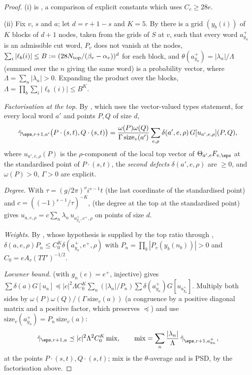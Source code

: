 \begin{proof}
(i) is , a comparison of explicit constants which uses $C_c\ge28e$.

(ii) Fix $v$, $s$ and $a$; let $d=r+1-s$ and $K=5$. By  there is a
grid $(y_b(i))$ of $K$ blocks of $d+1$ nodes, taken from the grids of $S$ at $v$, such that every word $a^+_{y_n}$ is an
admissible cut word, $P_v$ does not vanish at the nodes, $\sum_i|\ell_b(i)|\le B:=(28N_{\mathrm{top}}/(\beta_v-\alpha_v))^d$
for each block, and $\theta(a^+_{y_n})=|\lambda_n|/\Lambda$ (summed over the $n$ giving the same word) is a probability vector,
where $\Lambda=\sum_n|\lambda_n|>0$. Expanding the product over the blocks, $\Lambda=\prod_b\sum_i|\ell_b(i)|\le B^K$.

\emph{Factorisation at the top.} By , which uses the vector-valued types
statement, for every local word $a'$ and points $P,Q$ of size $d$,
\[
\tilde\gamma_{\eps,r+1,a'}\bigl(P\cdot(s,t),Q\cdot(s,t)\bigr)=\frac{\omega(P)\omega(Q)}{\Gamma\,\mathrm{size}_v(a')}\sum_{e,\rho}
\delta(a',e,\rho)\,G[u_{a',e,\rho}](P,Q),
\]
where $u_{a',e,\rho}(P)$ is the $\rho$-component of the local top vector of $\Theta_{a',e}F_{v,\eps}$ at the standardised point
of $P\cdot(s,t)$, the \emph{second defects} $\delta(a',e,\rho)$ are $\ge0$, and $\omega(P)>0$, $\Gamma>0$ are explicit.

\emph{Degree.} With $\tau=(g/2\pi)^{\nu}i^{s-1}t$ (the last coordinate of the standardised point) and
$c=((-1)^{s-1}/\tau)^{-K}$,  (the degree at the top at the standardised
point) gives $u_{a,e,\rho}=c\sum_n\lambda_n\,u_{a^+_{y_n},e^+,\rho}$ on points of size $d$.

\emph{Weights.} By , whose hypothesis is supplied by the
top ratio through ,
$\delta(a,e,\rho)P_n\le C_0^K\delta(a^+_{y_n},e^+,\rho)$ with $P_n=\prod_b|P_v(y_b(n_b))|>0$ and $C_0=eA_v(TT')^{-1/2}$.

\emph{Loewner bound.}  (with $g_n(e)=e^+$, injective) gives
$\sum\delta(a)G[u_a]\preceq|c|^2\Lambda C_0^K\sum_n(|\lambda_n|/P_n)\sum\delta(a^+_{y_n})G[u_{a^+_{y_n}}]$. Multiply both sides
by $\omega(P)\omega(Q)/(\Gamma\,\mathrm{size}_v(a))$ (a congruence by a positive diagonal matrix and a positive factor, which
preserves $\preceq$) and use $\mathrm{size}_v(a^+_{y_n})=P_n\,\mathrm{size}_v(a)$:
\[
\tilde\gamma_{\eps,r+1,a}\preceq|c|^2\Lambda^2C_0^K\,\mathrm{mix},\qquad\mathrm{mix}=\sum_n\frac{|\lambda_n|}{\Lambda}\,
\tilde\gamma_{\eps,r+1,a^+_{y_n}},
\]
at the points $P\cdot(s,t),Q\cdot(s,t)$; $\mathrm{mix}$ is the $\theta$-average and is PSD, by the factorisation above.


\end{proof}
